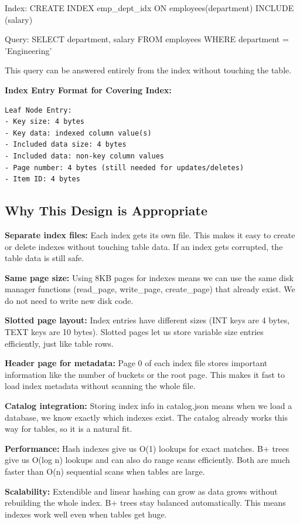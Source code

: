 \documentclass[11pt,a4paper]{article}
\begin{document}
Index: CREATE INDEX emp\_dept\_idx ON employees(department) INCLUDE (salary)

Query: SELECT department, salary FROM employees WHERE department = 'Engineering'

This query can be answered entirely from the index without touching the table.

\textbf{Index Entry Format for Covering Index:}
\begin{lstlisting}
Leaf Node Entry:
- Key size: 4 bytes
- Key data: indexed column value(s)
- Included data size: 4 bytes
- Included data: non-key column values
- Page number: 4 bytes (still needed for updates/deletes)
- Item ID: 4 bytes
\end{lstlisting}

\subsection{Why This Design is Appropriate}

\textbf{Separate index files:} Each index gets its own file. This makes it easy to create or delete indexes without touching table data. If an index gets corrupted, the table data is still safe.

\textbf{Same page size:} Using 8KB pages for indexes means we can use the same disk manager functions (read\_page, write\_page, create\_page) that already exist. We do not need to write new disk code.

\textbf{Slotted page layout:} Index entries have different sizes (INT keys are 4 bytes, TEXT keys are 10 bytes). Slotted pages let us store variable size entries efficiently, just like table rows.

\textbf{Header page for metadata:} Page 0 of each index file stores important information like the number of buckets or the root page. This makes it fast to load index metadata without scanning the whole file.

\textbf{Catalog integration:} Storing index info in catalog.json means when we load a database, we know exactly which indexes exist. The catalog already works this way for tables, so it is a natural fit.

\textbf{Performance:} Hash indexes give us O(1) lookups for exact matches. B+ trees give us O(log n) lookups and can also do range scans efficiently. Both are much faster than O(n) sequential scans when tables are large.

\textbf{Scalability:} Extendible and linear hashing can grow as data grows without rebuilding the whole index. B+ trees stay balanced automatically. This means indexes work well even when tables get huge.
\end{document}
